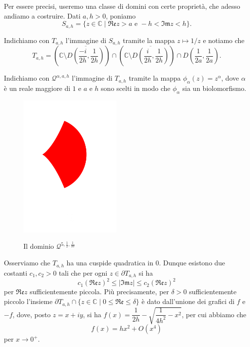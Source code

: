 Per essere precisi, useremo una classe di domini con certe proprietà, che adesso andiamo a costruire. Dati $a,h>0$, poniamo
$$S_{a,h}=\{z\in\mathbb{C}\mid\mathfrak{Re}z>a\text{ e }-h<\mathfrak{Im}z<h\}.$$

Indichiamo con $T_{a,h}$ l'immagine di $S_{a,h}$ tramite la mappa $z\longmapsto 1/z$ e notiamo che
$$T_{a,h}=\left(\mathbb{C}\setminus\overline{D\left(\frac{-i}{2h},\frac{1}{2h}\right)}\right)\cap\left(\mathbb{C}\setminus\overline{D\left(\frac{i}{2h},\frac{1}{2h}\right)}\right)\cap D\left(\frac{1}{2a},\frac{1}{2a}\right).$$

Indichiamo con $\mathcal{Q}^{\alpha,a,h}$ l'immagine di $T_{a,h}$ tramite la mappa $\phi_\alpha(z)=z^{\alpha}$, dove $\alpha$ è un reale maggiore di $1$ e $a$ e $h$ sono scelti in modo che $\phi_\alpha$ sia un biolomorfismo.

\begin{figure}[h!]
    \begin{center}
        \includegraphics[width=0.45\textwidth, trim=0 1cm 0 0]{Immagini/qalphaah.pdf} \\
        \caption{Il dominio $\mathcal{Q}^{5,\frac{1}{2},\frac{1}{10}}$}\label{siriooo}
    \end{center}
\end{figure}

Osserviamo che $T_{a,h}$ ha una cuspide quadratica in $0$. Dunque esistono due costanti $c_1,c_2>0$ tali che per ogni $z\in\partial T_{a,h}$ si ha
\begin{equation} \label{cusp_estimate}
    c_1(\mathfrak{Re}z)^2 \le |\mathfrak{Im}z| \le c_2(\mathfrak{Re}z)^2
\end{equation}
per $\mathfrak{Re}z$ sufficientemente piccola. Più precisamente, per $\delta>0$ sufficientemente piccolo l'insieme $\partial T_{a,h}\cap\{z\in\mathbb{C}\mid 0 \le \mathfrak{Re}\le\delta\}$ è dato dall'unione dei grafici di $f$ e $-f$, dove, posto $z=x+iy$, si ha $f(x)=\dfrac{1}{2h}-\sqrt{\dfrac{1}{4h^2}-x^2}$, per cui abbiamo che
\begin{equation} \label{cerchio}
    f(x)=hx^2+O(x^4)
\end{equation}
per $x\longrightarrow0^+$.

